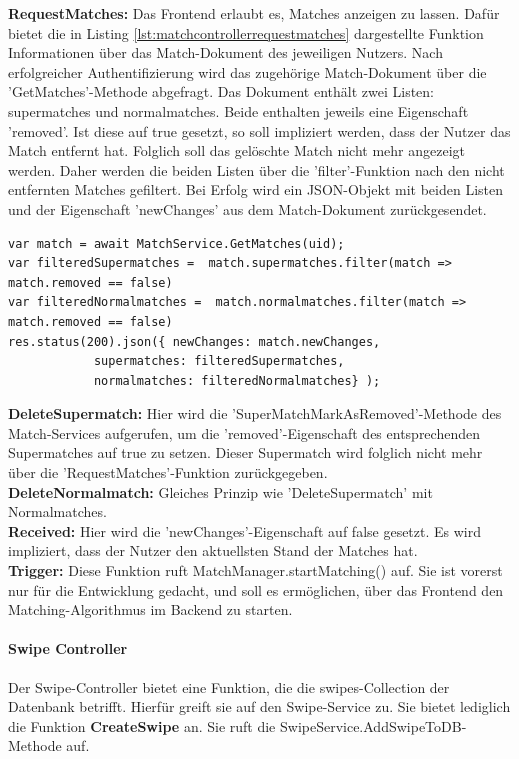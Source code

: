 \noindent
\textbf{RequestMatches:} 
Das Frontend erlaubt es, Matches anzeigen zu lassen. Dafür bietet die in Listing \ref{lst:matchcontrollerrequestmatches} dargestellte Funktion Informationen über das Match-Dokument des jeweiligen Nutzers. Nach erfolgreicher Authentifizierung wird das zugehörige Match-Dokument über die 'GetMatches'-Methode abgefragt. Das Dokument enthält zwei Listen: supermatches und normalmatches. Beide enthalten jeweils eine Eigenschaft 'removed'. Ist diese auf true gesetzt, so soll impliziert werden, dass der Nutzer das Match entfernt hat. Folglich soll das gelöschte Match nicht mehr angezeigt werden. Daher werden die beiden Listen über die 'filter'-Funktion nach den nicht entfernten Matches gefiltert. Bei Erfolg wird ein JSON-Objekt mit beiden Listen und der Eigenschaft 'newChanges' aus dem Match-Dokument zurückgesendet.\\
 
\begin{lstlisting}[caption=MatchController - RequestMatches, label=lst:matchcontrollerrequestmatches]
var match = await MatchService.GetMatches(uid);
var filteredSupermatches =  match.supermatches.filter(match => match.removed == false)
var filteredNormalmatches =  match.normalmatches.filter(match => match.removed == false)
res.status(200).json({ newChanges: match.newChanges,
            supermatches: filteredSupermatches, 
            normalmatches: filteredNormalmatches} );
\end{lstlisting}

\noindent
\textbf{DeleteSupermatch:} 
Hier wird die 'SuperMatchMarkAsRemoved'-Methode des Match-Services aufgerufen, um die 'removed'-Eigenschaft des entsprechenden Supermatches auf true zu setzen. Dieser Supermatch wird folglich nicht mehr über die 'RequestMatches'-Funktion zurückgegeben.\\

\noindent
\textbf{DeleteNormalmatch:} 
Gleiches Prinzip wie 'DeleteSupermatch' mit Normalmatches.\\

\noindent
\textbf{Received:} 
Hier wird die 'newChanges'-Eigenschaft auf false gesetzt. Es wird impliziert, dass der Nutzer den aktuellsten Stand der Matches hat.\\

\noindent
\textbf{Trigger:} 
Diese Funktion ruft MatchManager.startMatching() auf. Sie ist vorerst nur für die Entwicklung gedacht, und soll es ermöglichen, über das Frontend den Matching-Algorithmus im Backend zu starten.\\

%
%


\paragraph{Swipe Controller}
Der Swipe-Controller bietet eine Funktion, die die swipes-Collection der Datenbank betrifft. Hierfür greift sie auf den Swipe-Service zu.
Sie bietet lediglich die Funktion \textbf{CreateSwipe} an. Sie ruft die SwipeService.AddSwipeToDB-Methode auf.
